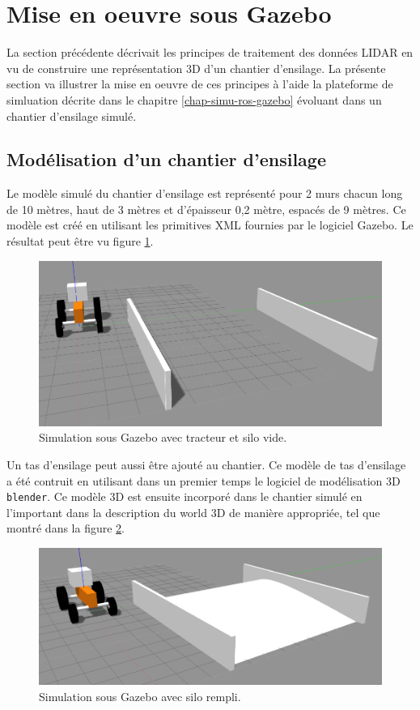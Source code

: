 \documentclass[12pt,a4paper]{report}
\begin{document}
	\section{Mise en oeuvre sous Gazebo}
	
	La section précédente décrivait les principes de traitement des données LIDAR en vu de construire une représentation 3D d'un chantier d'ensilage. La présente section va illustrer la mise en oeuvre de ces principes à l'aide la plateforme de simluation décrite dans le chapitre \ref{chap-simu-ros-gazebo} évoluant dans un chantier d'ensilage simulé.
	
		\subsection{Modélisation d'un chantier d'ensilage}
		Le modèle simulé du chantier d'ensilage est représenté pour 2 murs chacun long de 10 mètres, haut de 3 mètres et d'épaisseur 0,2 mètre, espacés de 9 mètres. Ce modèle est créé en utilisant les primitives XML fournies par le logiciel Gazebo. Le résultat peut être vu figure \ref{fig:silovide-gazebo}.
		
		\begin{figure}[h!]
			\centering
			\includegraphics[width=0.7\linewidth]{img/silovide-gazebo}
			\caption[silovide]{Simulation sous Gazebo avec tracteur et silo vide.}
			\label{fig:silovide-gazebo}
		\end{figure}
		
		\para Un tas d'ensilage peut aussi être ajouté au chantier. Ce modèle de tas d'ensilage a été contruit en utilisant dans un premier temps le logiciel de modélisation 3D \verb|blender|. Ce modèle 3D est ensuite incorporé dans le chantier simulé en l'important dans la description du world 3D de manière appropriée, tel que montré dans la figure \ref{fig:silorempli-gazebo}.
	
	\begin{figure}[h!]
		\centering
		\includegraphics[width=0.7\linewidth]{img/silorempli-gazebo}
		\caption[silorempli]{Simulation sous Gazebo avec silo rempli.}
		\label{fig:silorempli-gazebo}
	\end{figure}
	
\end{document}

